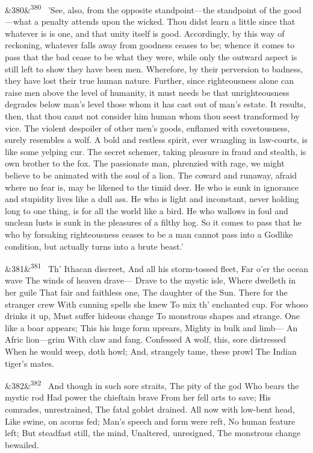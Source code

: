 \documentclass[12pt]{article}
\newcommand{\para}[1][]{\par\noindent\ifx&#1&\else\textsuperscript{\footnotesize #1}~\fi}
\begin{document}
\para[380] 'See, also, from the opposite standpoint---the standpoint of the good---what a penalty attends upon the wicked. Thou didst learn a little since that whatever is is one, and that unity itself is good. Accordingly, by this way of reckoning, whatever falls away from goodness ceases to be; whence it comes to pass that the bad cease to be what they were, while only the outward aspect is still left to show they have been men. Wherefore, by their perversion to badness, they have lost their true human nature. Further, since righteousness alone can raise men above the level of humanity, it must needs be that unrighteousness degrades below man's level those whom it has cast out of man's estate. It results, then, that thou canst not consider him human whom thou seest transformed by vice. The violent despoiler of other men's goods, enflamed with covetousness, surely resembles a wolf. A bold and restless spirit, ever wrangling in law-courts, is like some yelping cur. The secret schemer, taking pleasure in fraud and stealth, is own brother to the fox. The passionate man, phrenzied with rage, we might believe to be animated with the soul of a lion. The coward and runaway, afraid where no fear is, may be likened to the timid deer. He who is sunk in ignorance and stupidity lives like a dull ass. He who is light and inconstant, never holding long to one thing, is for all the world like a bird. He who wallows in foul and unclean lusts is sunk in the pleasures of a filthy hog. So it comes to pass that he who by forsaking righteousness ceases to be a man cannot pass into a Godlike condition, but actually turns into a brute beast.'

\para[381] Th' Ithacan discreet, And all his storm-tossed fleet, Far o'er the ocean wave The winds of heaven drave--- Drave to the mystic isle, Where dwelleth in her guile That fair and faithless one, The daughter of the Sun. There for the stranger crew With cunning spells she knew To mix th' enchanted cup. For whoso drinks it up, Must suffer hideous change To monstrous shapes and strange. One like a boar appears; This his huge form uprears, Mighty in bulk and limb--- An Afric lion---grim With claw and fang. Confessed A wolf, this, sore distressed When he would weep, doth howl; And, strangely tame, these prowl The Indian tiger's mates.

\para[382] And though in such sore straits, The pity of the god Who bears the mystic rod Had power the chieftain brave From her fell arts to save; His comrades, unrestrained, The fatal goblet drained. All now with low-bent head, Like swine, on acorns fed; Man's speech and form were reft, No human feature left; But steadfast still, the mind, Unaltered, unresigned, The monstrous change bewailed.
\end{document}
